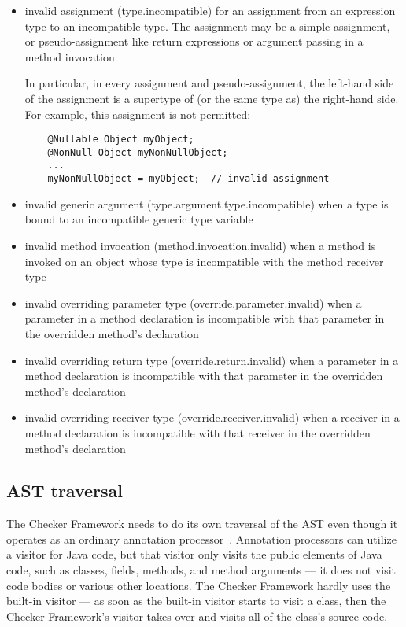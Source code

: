 \begin{itemize}

\item invalid assignment (type.incompatible) for an assignment from
  an expression type to an incompatible type.  The assignment may be a
  simple assignment, or pseudo-assignment like return expressions or
  argument passing in a method invocation

  In particular, in every assignment and pseudo-assignment, the
  left-hand side of the assignment is a supertype of (or the same type
  as) the right-hand side.  For example, this assignment is not
  permitted:

  \begin{Verbatim}
    @Nullable Object myObject;
    @NonNull Object myNonNullObject;
    ...
    myNonNullObject = myObject;  // invalid assignment
  \end{Verbatim}

\item invalid generic argument (type.argument.type.incompatible) when a type
  is bound to an incompatible generic type variable

\item invalid method invocation (method.invocation.invalid) when a
  method is invoked on an object whose type is incompatible with the
  method receiver type

\item invalid overriding parameter type (override.parameter.invalid)
  when a parameter in a method declaration is incompatible with that
  parameter in the overridden method's declaration

\item invalid overriding return type (override.return.invalid) when a
  parameter in a method declaration is incompatible with that
  parameter in the overridden method's declaration

\item invalid overriding receiver type (override.receiver.invalid)
  when a receiver in a method declaration is incompatible with that
  receiver in the overridden method's declaration

\end{itemize}


\subsection{AST traversal\label{ast-traversal}}

The Checker Framework needs to do its own traversal of the AST even though
it operates as an ordinary annotation processor~\cite{JSR269}.  Annotation
processors can utilize a visitor for Java code, but that visitor only
visits the public elements of Java code, such as classes, fields, methods,
and method arguments --- it does not visit code bodies or various other
locations.  The Checker Framework hardly uses the built-in visitor --- as
soon as the built-in visitor starts to visit a class, then the Checker
Framework's visitor takes over and visits all of the class's source code.

